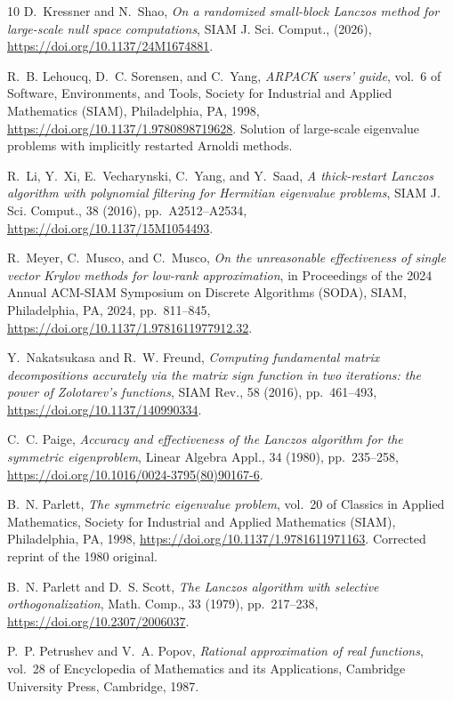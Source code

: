 \documentclass{siamart190516}
\begin{document}
\begin{thebibliography}{10}
{\sc D.~Kressner and N.~Shao}, {\em On a randomized small-block {L}anczos method for large-scale null space computations}, SIAM J. Sci. Comput.,  (2026), \url{https://doi.org/10.1137/24M1674881}.

{\sc R.~B. Lehoucq, D.~C. Sorensen, and C.~Yang}, {\em A{RPACK} users' guide}, vol.~6 of Software, Environments, and Tools, Society for Industrial and Applied Mathematics (SIAM), Philadelphia, PA, 1998, \url{https://doi.org/10.1137/1.9780898719628}.
\newblock Solution of large-scale eigenvalue problems with implicitly restarted Arnoldi methods.

{\sc R.~Li, Y.~Xi, E.~Vecharynski, C.~Yang, and Y.~Saad}, {\em A thick-restart {L}anczos algorithm with polynomial filtering for {H}ermitian eigenvalue problems}, SIAM J. Sci. Comput., 38 (2016), pp.~A2512--A2534, \url{https://doi.org/10.1137/15M1054493}.

{\sc R.~Meyer, C.~Musco, and C.~Musco}, {\em On the unreasonable effectiveness of single vector {K}rylov methods for low-rank approximation}, in Proceedings of the 2024 {A}nnual {ACM}-{SIAM} {S}ymposium on {D}iscrete {A}lgorithms ({SODA}), SIAM, Philadelphia, PA, 2024, pp.~811--845, \url{https://doi.org/10.1137/1.9781611977912.32}.

{\sc Y.~Nakatsukasa and R.~W. Freund}, {\em Computing fundamental matrix decompositions accurately via the matrix sign function in two iterations: the power of {Z}olotarev's functions}, SIAM Rev., 58 (2016), pp.~461--493, \url{https://doi.org/10.1137/140990334}.

{\sc C.~C. Paige}, {\em Accuracy and effectiveness of the {L}anczos algorithm for the symmetric eigenproblem}, Linear Algebra Appl., 34 (1980), pp.~235--258, \url{https://doi.org/10.1016/0024-3795(80)90167-6}.

{\sc B.~N. Parlett}, {\em The symmetric eigenvalue problem}, vol.~20 of Classics in Applied Mathematics, Society for Industrial and Applied Mathematics (SIAM), Philadelphia, PA, 1998, \url{https://doi.org/10.1137/1.9781611971163}.
\newblock Corrected reprint of the 1980 original.

{\sc B.~N. Parlett and D.~S. Scott}, {\em The {L}anczos algorithm with selective orthogonalization}, Math. Comp., 33 (1979), pp.~217--238, \url{https://doi.org/10.2307/2006037}.

{\sc P.~P. Petrushev and V.~A. Popov}, {\em Rational approximation of real functions}, vol.~28 of Encyclopedia of Mathematics and its Applications, Cambridge University Press, Cambridge, 1987.


\end{thebibliography}
\end{document}
